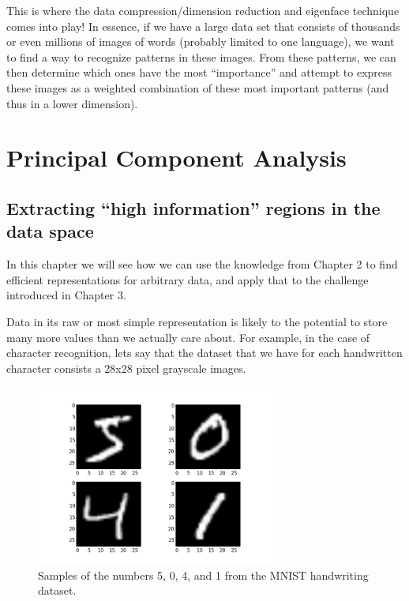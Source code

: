 \documentclass[12pt]{report}
\begin{document}
            This is where the data compression/dimension reduction and eigenface technique comes into play! In essence, if we have a large data set that consists of thousands or even millions of images of words (probably limited to one language), we want to find a way to recognize patterns in these images. From these patterns, we can then determine which ones have the most ``importance'' and attempt to express these images as a weighted combination of these most important patterns (and thus in a lower dimension).
        
    
    \chapter{Principal Component Analysis}
        \section{Extracting ``high information'' regions in the data space}
            In this chapter we will see how we can use the knowledge from Chapter 2 to find efficient representations for arbitrary data, and apply that to the challenge introduced in Chapter 3.

            Data in its raw or most simple representation is likely to the potential to store many more values than we actually care about. For example, in the case of character recognition, lets say that the dataset that we have for each handwritten character consists a 28x28 pixel grayscale images.

            \begin{figure}[H]
                \centering
                \includegraphics[width=0.7\textwidth]{mnist-handwriting-dataset.jpg}
                \caption{\label{fig:mnist-handwriting-dataset} Samples of the numbers 5, 0, 4, and 1 from the MNIST handwriting dataset.}
            \end{figure}
\end{document}
